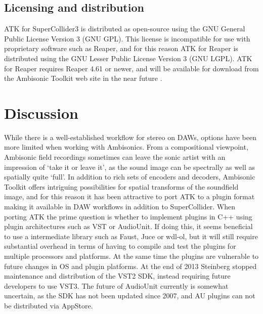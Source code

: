 \documentclass{article}
\begin{document}
\subsection{Licensing and distribution}\label{sec:license}

ATK for SuperCollider3 is distributed as open-source using the GNU General Public License Version 3 (GNU GPL). This license is incompatible for use with proprietary software such as Reaper, and for this reason ATK for Reaper is distributed using the GNU Lesser Public License Version 3 (GNU LGPL).
ATK for Reaper requires Reaper 4.61 or newer, and will be available for download from the Ambisonic Toolkit web site in the near future \cite{ambisonictoolkit.net:2014}.



\section{Discussion}\label{sec:discussion}

While there is a well-established workflow for stereo on DAWs, options have been more limited when working with Ambisonics.
From a compositional viewpoint, Ambisonic field recordings sometimes can leave the sonic artist with an impression of `take it or leave it', as the sound image can be spectrally as well as spatially quite `full'.
In addition to rich sets of encoders and decoders, Ambisonic Toolkit offers intriguing possibilities for spatial transforms of the soundfield image, and for this reason it has been attractive to port ATK to a plugin format making it available in DAW workflows in addition to SuperCollider.
When porting ATK the prime question is whether to implement plugins in C++ using plugin architectures such as VST or AudioUnit.
If doing this, it seems beneficial to use a intermediate library such as Faust, Juce or wdl-ol, but it will still require substantial overhead in terms of having to compile and test the plugins for multiple processors and platforms.
At the same time the plugins are vulnerable to future changes in OS and plugin platforms.
At the end of 2013 Steinberg stopped maintenance and distribution of the VST2 SDK, instead requiring future developers to use VST3. The future of AudioUnit currently is somewhat uncertain, as the SDK has not been updated since 2007, and AU plugins can not be distributed via AppStore.
\end{document}
